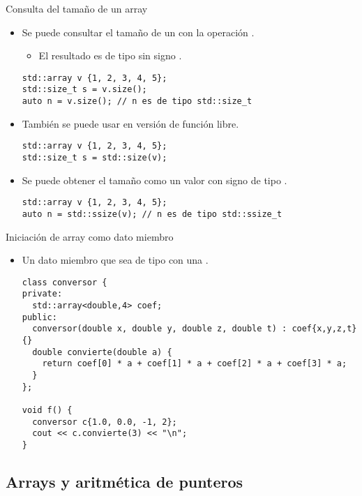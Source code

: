 \begin{frame}[t,fragile]{Consulta del tamaño de un array}
\begin{itemize}
  \item Se puede consultar el tamaño de un  con la 
        operación .
    \begin{itemize}
      \item El resultado es de tipo sin signo .
    \end{itemize}
\begin{lstlisting}
std::array v {1, 2, 3, 4, 5};
std::size_t s = v.size();
auto n = v.size(); // n es de tipo std::size_t
\end{lstlisting}

  \item También se puede usar en versión de función libre.
\begin{lstlisting}
std::array v {1, 2, 3, 4, 5};
std::size_t s = std::size(v);
\end{lstlisting}

  \item Se puede obtener el tamaño como un valor con signo de tipo .
\begin{lstlisting}
std::array v {1, 2, 3, 4, 5};
auto n = std::ssize(v); // n es de tipo std::ssize_t
\end{lstlisting}
\end{itemize}
\end{frame}

\begin{frame}[t,fragile]{Iniciación de array como dato miembro}
\begin{itemize}
  \item Un dato miembro que sea de tipo   
        con una .
\begin{lstlisting}
class conversor {
private:
  std::array<double,4> coef;
public:
  conversor(double x, double y, double z, double t) : coef{x,y,z,t} {}
  double convierte(double a) {
    return coef[0] * a + coef[1] * a + coef[2] * a + coef[3] * a;
  }
};

void f() {
  conversor c{1.0, 0.0, -1, 2};
  cout << c.convierte(3) << "\n";
}
\end{lstlisting}
\end{itemize}
\end{frame}

\subsection{Arrays y aritmética de punteros}


